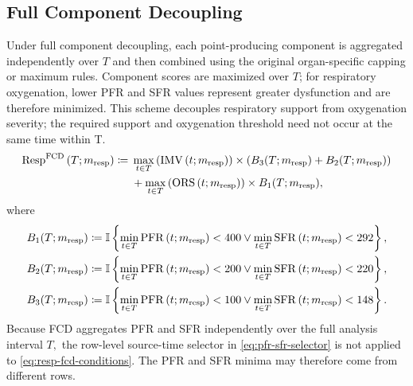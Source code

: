 \documentclass[letterpaper,10pt]{article}
\begin{document}
\subsection{Full Component Decoupling}\label{sec:fcd}

Under full component decoupling, each point-producing component is aggregated
independently over $T$ and then combined using the original organ-specific
capping or maximum rules. Component scores are maximized over $T$; for
respiratory oxygenation, lower PFR and SFR values represent greater dysfunction
and are therefore minimized.
This scheme decouples respiratory support from oxygenation severity; the
required support and oxygenation threshold need not occur at the same time
within T.
\begin{equation}
  \label{eq:resp-fcd}
  \begin{split}
    \mathrm{Resp}^{\mathrm{FCD}}\left(T;m_{\mathrm{resp}}\right) \coloneqq{}
    & \max_{t \in T} \left( \mathrm{IMV}\left(t; m_{\mathrm{resp}}\right) \right) \times \left(B_3(T; m_{\mathrm{resp}}) + B_2(T; m_{\mathrm{resp}})\right) \\
    &+ \max_{t \in T} \left(\mathrm{ORS}\left(t; m_{\mathrm{resp}}\right)\right) \times B_1(T; m_{\mathrm{resp}}),
  \end{split}
\end{equation}
where
\begin{equation}
  \label{eq:resp-fcd-conditions}
\begin{aligned}
  B_1(T; m_{\mathrm{resp}}) &\coloneqq \mathbb{I}\left\{\min_{t \in T} \mathrm{PFR}\left(t; m_{\mathrm{resp}}\right) < 400 \vee \min_{t \in T} \mathrm{SFR}\left(t; m_{\mathrm{resp}}\right) < 292\right\}, \\
  B_2(T; m_{\mathrm{resp}}) &\coloneqq \mathbb{I}\left\{\min_{t \in T} \mathrm{PFR}\left(t; m_{\mathrm{resp}}\right) < 200 \vee \min_{t \in T} \mathrm{SFR}\left(t; m_{\mathrm{resp}}\right) < 220\right\}, \\
  B_3(T; m_{\mathrm{resp}}) &\coloneqq \mathbb{I}\left\{\min_{t \in T} \mathrm{PFR}\left(t; m_{\mathrm{resp}}\right) < 100 \vee \min_{t \in T} \mathrm{SFR}\left(t; m_{\mathrm{resp}}\right) < 148\right\}.
\end{aligned}
\end{equation}
Because FCD aggregates PFR and SFR independently over the full analysis interval
$T,$ the row-level source-time selector in \eqref{eq:pfr-sfr-selector} is not
applied to \eqref{eq:resp-fcd-conditions}. The PFR and SFR minima may therefore
come from different rows.
\end{document}
